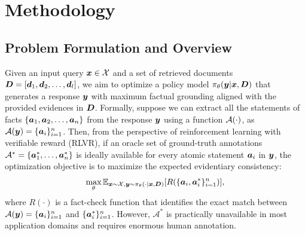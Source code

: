 \documentclass[10pt, a4paper, logo]{googledeepmind} %
\begin{document}


\section{Methodology}
\subsection{Problem Formulation and Overview}
Given an input query ${\bm{x}} \in {\mathcal{X}}$ and a set of retrieved documents ${\bm{D}} = [{\bm{d}}_1, {\bm{d}}_2, \dots, {\bm{d}}_l]$, we aim to optimize a policy model $\pi_{\theta}({\bm{y}}|{\bm{x}}, {\bm{D}})$ that generates a response ${\bm{y}}$ with maximum factual grounding aligned with the provided evidences in ${\bm{D}}$. Formally, suppose we can extract all the statements of facts $\{{\bm{a}}_1,{\bm{a}}_2,\dots,{\bm{a}}_n\}$ from the response ${\bm{y}}$ using a function ${\mathcal{A}}(\cdot)$, as ${\mathcal{A}}({\bm{y}}) = \{{\bm{a}}_i\}_{i=1}^n$. Then, from the perspective of reinforcement learning with verifiable reward (RLVR), if an oracle set of ground-truth annotations $\mathcal{A}^* = \{{\bm{a}}^*_1, \dots, {\bm{a}}^*_n\}$ is ideally available for every atomic statement ${\bm{a}}_i$ in ${\bm{y}}$, the optimization objective is to maximize the expected evidentiary consistency:
\begin{equation}\label{eq:oracle_objective}
   \max_{\theta} \mathbb{E}_{{\bm{x}}\sim {\mathcal{X}}, {\bm{y}} \sim \pi_{\theta}(\cdot | {\bm{x}}, {\bm{D}})} [ R(\{{\bm{a}}_i, {\bm{a}}^*_i\}_{i=1}^n) ],
\end{equation}
where $R(\cdot)$ is a fact-check function that identifies the exact match between $\mathcal{A}({\bm{y}}) = \{{\bm{a}}_i\}_{i=1}^n$ and $\{{\bm{a}}^*_i\}_{i=1}^n$. However, $\mathcal{A}^*$ is practically unavailable in most application domains and requires enormous human annotation. 
\end{document}
